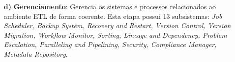 \begin{itemize}
	\item[\textbf{d)}] \textbf{Gerenciamento}: Gerencia os sistemas e processos relacionados ao ambiente ETL de forma coerente. Esta etapa possui 13 subsistemas: \textit{Job Scheduler, Backup System, Recovery and Restart, Version Control, Version Migration, Workflow Monitor, Sorting, Lineage and Dependency, Problem Escalation, Paralleling and Pipelining, Security, Compliance Manager, Metadata Repository}.

\end{itemize}
